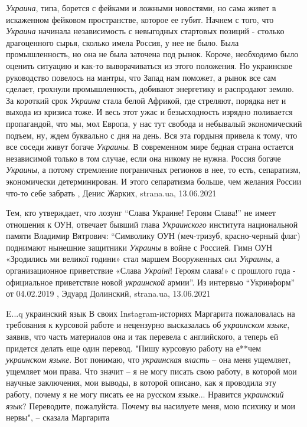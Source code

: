 \emph{Украина}, типа, борется с фейками и ложными новостями, но сама живет в
искаженном фейковом пространстве, которое ее губит. Начнем с того, что \emph{Украина}
начинала независимость с невыгодных стартовых позиций - столько драгоценного
сырья, сколько имела Россия, у нее не было. Была промышленность, но она не была
заточена под рынок. Короче, необходимо было оценить ситуацию и как-то
выворачиваться из этого положения.  Но украинское руководство повелось на
мантры, что Запад нам поможет, а рынок все сам сделает, грохнули
промышленность, добивают энергетику и распродают землю. За короткий срок
\emph{Украина} стала белой Африкой, где стреляют, порядка нет и выхода из кризиса
тоже. И весь этот ужас и безысходность изрядно поливается пропагандой, что мы,
мол Европа, у нас тут свобода и небывалый экономический подъем, ну, ждем
буквально с дня на день.  Вся эта гордыня привела к тому, что все соседи живут
богаче \emph{Украины}. В современном мире бедная страна остается независимой только в
том случае, если она никому не нужна. Россия богаче \emph{Украины}, а потому
стремление пограничных регионов в нее, то есть, сепаратизм, экономически
детерминирован. И этого сепаратизма больше, чем желания России что-то себе
забрать
, 
Денис Жарких, strana.ua, 13.06.2021

Тем, кто утверждает, что лозунг \enquote{Слава Украине! Героям Слава!} не имеет
отношения к ОУН, отвечает бывший глава \emph{Украинского} института национальной
памяти Владимир Вятрович: \enquote{Символику ОУН (меч-тризуб, красно-черный
флаг) поднимают нынешние защитники \emph{Украины} в войне с Россией. Гимн ОУН
«Зродились ми великої години» стал маршем Вооруженных сил \emph{Украины}, а
организационное приветствие «Слава \emph{Україні}! Героям слава!» с прошлого года -
официальное приветствие новой \emph{украинской} армии}.  Из интервью
\enquote{Укринформ} от 04.02.2019
, 
Эдуард Долинский, strana.ua, 13.06.2021

E...q украинский язык 
В своих Instagram-историях Маргарита пожаловалась на требования к курсовой
работе и нецензурно высказалась об \emph{украинском языке}, заявив, что часть
материалов она и так перевела с английского, а теперь ей придется делать еще
один перевод.  "Пишу курсовую работу на е**чем \emph{украинском языке}. Вот понимаю,
что \emph{украинская власть} – она меня ущемляет, ущемляет мои права. Что значит – я
не могу писать свою работу, в которой мои научные заключения, мои выводы, в
которой описано, как я проводила эту работу, почему я не могу писать ее на
русском языке... Нравится \emph{украинский язык}? Переводите, пожалуйста. Почему вы
насилуете меня, мою психику и мои нервы", – сказала Маргарита

